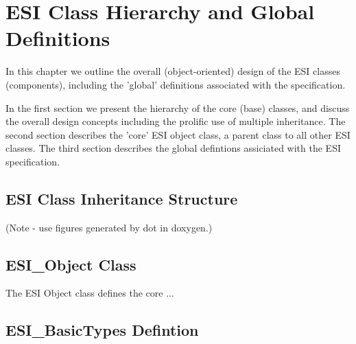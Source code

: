 \chapter{ESI Class Hierarchy and Global Definitions}

In this chapter we outline the overall (object-oriented) design
of the ESI classes (components), including the 'global' definitions
associated with the specification.

In the first section we present the hierarchy of the core (base) classes, 
and discuss the overall design concepts including the prolific use of
multiple inheritance.  The second section describes the 'core' ESI
object class, a parent class to all other ESI classes.  The third section
describes the global defintions assiciated with the ESI specification.

\section{ESI Class Inheritance Structure}

(Note - use figures generated by dot in doxygen.)

\section{ESI\_Object Class}

The ESI Object class defines the core ... 

\section{ESI\_BasicTypes Defintion}
